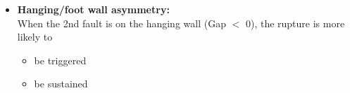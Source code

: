 \documentclass{beamer}
\begin{document}
\begin{frame}
\begin{minipage}{0.5\linewidth}
\begin{center}
  \end{center}
  \vskip -0.3cm
  \begin{itemize}
   \item[\ding{43}] {\scriptsize \textbf{Hanging/foot wall asymmetry:} \\
                    When the 2nd fault is on the hanging wall 
                    (Gap $<$ 0), the rupture is more likely to }
                    \begin{itemize}
                     \item \scriptsize be triggered
                     \item \scriptsize be sustained
                    \end{itemize}
  \end{itemize}
 \end{minipage}
  
\end{frame}
\end{document}

